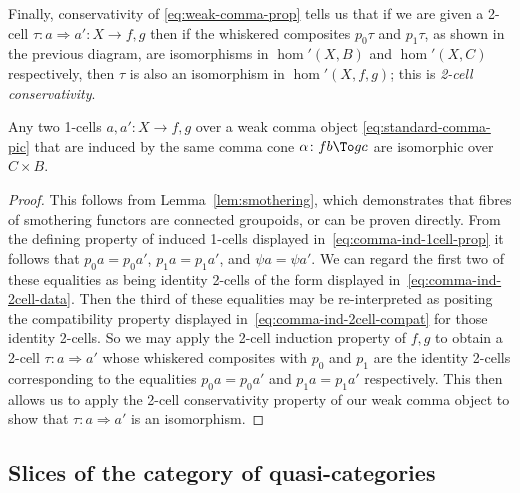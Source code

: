 \begin{obs}
    Finally, conservativity of \eqref{eq:weak-comma-prop} tells us that if we are given a 2-cell $\tau\colon a\Rightarrow a' \colon X \to f \comma g$ then if the whiskered composites $p_0\tau$ and $p_1\tau$, as shown in the previous diagram, are isomorphisms in $\hom'(X,B)$ and $\hom'(X,C)$ respectively, then $\tau$ is also an isomorphism in $\hom'(X,f\comma g)$; this is \emph{2-cell conservativity}.
 \end{obs}

\begin{lem}\label{lem:1cell-ind-uniqueness}
Any two 1-cells $a,a' \colon X \to f \comma g$ over a weak comma object \eqref{eq:standard-comma-pic} that are induced by the same comma cone $\alpha \colon fb \To gc$ are isomorphic over $C \times B$. 
\end{lem}
\begin{proof}
This follows from Lemma~\ref{lem:smothering}, which demonstrates that fibres of smothering functors are connected groupoids, or can be proven directly. From the defining property of induced 1-cells displayed in~\eqref{eq:comma-ind-1cell-prop} it follows that $p_0 a = p_0 a'$, $p_1 a = p_1 a'$, and $\psi a = \psi a'$. We can regard the first two of these equalities as being identity 2-cells of the form displayed in~\eqref{eq:comma-ind-2cell-data}. Then the third of these equalities may be re-interpreted as positing the compatibility property displayed in~\eqref{eq:comma-ind-2cell-compat} for those identity 2-cells. So we may apply the 2-cell induction property of $f\comma g$ to obtain a 2-cell $\tau\colon a\Rightarrow a'$ whose whiskered composites with $p_0$ and $p_1$ are the identity 2-cells corresponding to the equalities $p_0 a = p_0 a'$ and $p_1 a = p_1 a'$ respectively. This then allows us to apply the 2-cell conservativity property of our weak comma object to show that $\tau\colon a\Rightarrow a'$ is an isomorphism.
 \end{proof}

\subsection{Slices of the category of quasi-categories}\label{subsec:slice-2cats-of-qcats}

